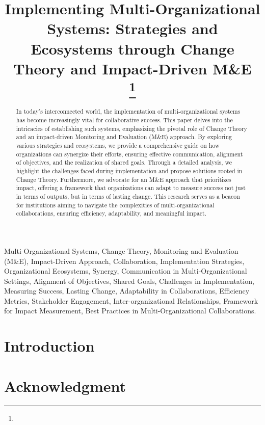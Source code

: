 \documentclass[conference]{IEEEtran}
\begin{document}
\title{Implementing Multi-Organizational Systems: Strategies and Ecosystems through Change Theory and Impact-Driven M\&E\\
{\footnotesize \textsuperscript{}}
\thanks{}
}

\author{
}
\maketitle

\begin{abstract}
In today's interconnected world, the implementation of multi-organizational systems has become increasingly vital for collaborative success. This paper delves into the intricacies of establishing such systems, emphasizing the pivotal role of Change Theory and an impact-driven Monitoring and Evaluation (M\&E) approach. By exploring various strategies and ecosystems, we provide a comprehensive guide on how organizations can synergize their efforts, ensuring effective communication, alignment of objectives, and the realization of shared goals. Through a detailed analysis, we highlight the challenges faced during implementation and propose solutions rooted in Change Theory. Furthermore, we advocate for an M\&E approach that prioritizes impact, offering a framework that organizations can adapt to measure success not just in terms of outputs, but in terms of lasting change. This research serves as a beacon for institutions aiming to navigate the complexities of multi-organizational collaborations, ensuring efficiency, adaptability, and meaningful impact.
\end{abstract}

\vspace{8pt}
\begin{IEEEkeywords}
Multi-Organizational Systems, Change Theory, Monitoring and Evaluation (M\&E), Impact-Driven Approach, Collaboration, Implementation Strategies, Organizational Ecosystems, Synergy, Communication in Multi-Organizational Settings, Alignment of Objectives, Shared Goals, Challenges in Implementation, Measuring Success, Lasting Change, Adaptability in Collaborations, Efficiency Metrics, Stakeholder Engagement, Inter-organizational Relationships, Framework for Impact Measurement, Best Practices in Multi-Organizational Collaborations.
\end{IEEEkeywords}
\vspace{16pt}

\section{Introduction}


\section*{Acknowledgment}
\vspace{12pt}


\end{document}
